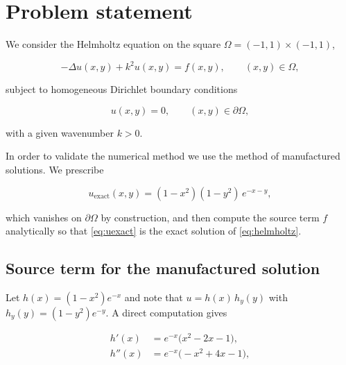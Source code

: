 \documentclass[11pt,a4paper,twoside,pdf]{article}
\numberwithin{equation}{section}
\begin{document}

\tableofcontents

\pagestyle{fancy}
\fancyhead[RO,LE]{\leftmark}
\fancyhead[LO,RE]{\thepage}
\fancyfoot{}

\newpage

\section{Problem statement}
\label{sec:intro}

We consider the Helmholtz equation on the square
$\Omega = (-1,1)\times(-1,1)$,

\begin{equation}
\label{eq:helmholtz}
-\Delta u(x,y) + k^{2} u(x,y) = f(x,y),
\qquad (x,y) \in \Omega,
\end{equation}

subject to homogeneous Dirichlet boundary conditions

\begin{equation}
u(x,y) = 0,
\qquad (x,y) \in \partial\Omega,
\end{equation}

with a given wavenumber $k > 0$.

In order to validate the numerical method we use the method of
manufactured solutions. We prescribe

\begin{equation}
\label{eq:uexact}
u_{\text{exact}}(x,y) = (1-x^{2})(1-y^{2})\, e^{-x-y},
\end{equation}

which vanishes on $\partial\Omega$ by construction, and then compute
the source term $f$ analytically so that \eqref{eq:uexact} is the
exact solution of \eqref{eq:helmholtz}.

\subsection{Source term for the manufactured solution}

Let $h(x) = (1-x^{2}) e^{-x}$ and note that
$u = h(x)\, h_{y}(y)$ with $h_{y}(y) = (1-y^{2}) e^{-y}$.
A direct computation gives

\begin{align*}
h'(x)  &= e^{-x}\bigl(x^{2} - 2x - 1\bigr), \\
h''(x) &= e^{-x}\bigl(-x^{2} + 4x - 1\bigr),
\end{align*}
\end{document}
